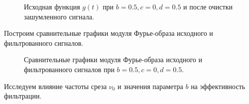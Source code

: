 \documentclass[a5paper, 10pt]{article}
\theoremstyle{definition}
\theoremstyle{plain}
\theoremstyle{remark}
\begin{document}
\begin{figure}[h!]
\caption{Исходная функция $g(t)$ при $b = 0.5, c = 0, d = 0.5$  и после очистки зашумленного сигнала.}
\end{figure}




\newpage


Построим сравнительные графики модуля Фурье-образа исходного и фильтрованного сигналов.


\begin{figure}[h!]
\caption{Сравнительные графики модуля Фурье-образа исходного и фильтрованного сигналов при $b = 0.5, c = 0, d = 0.5$.}
\end{figure}

Исследуем влияние частоты среза $\nu_0$ и значения параметра $b$ на эффективность фильтрации. \\
\end{document}
